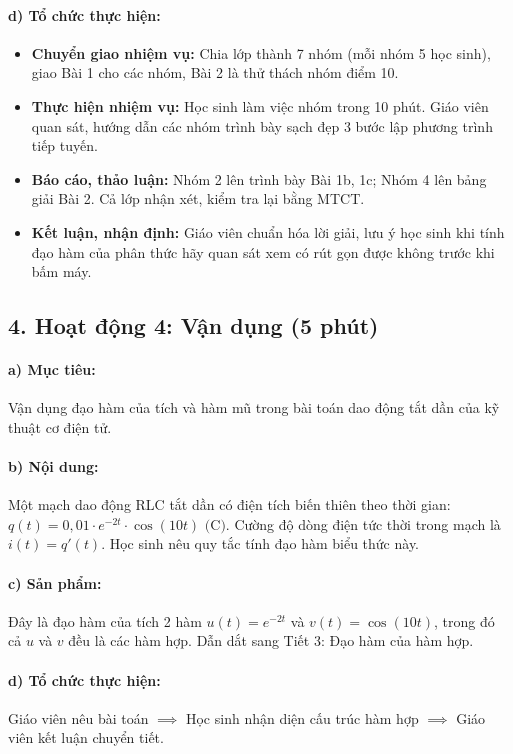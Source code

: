\documentclass[12pt, a4paper]{article}
\begin{document}
\paragraph{d) Tổ chức thực hiện:}
\begin{itemize}[leftmargin=0.8cm]
    \item \textbf{Chuyển giao nhiệm vụ:} Chia lớp thành 7 nhóm (mỗi nhóm 5 học sinh), giao Bài 1 cho các nhóm, Bài 2 là thử thách nhóm điểm 10.
    \item \textbf{Thực hiện nhiệm vụ:} Học sinh làm việc nhóm trong 10 phút. Giáo viên quan sát, hướng dẫn các nhóm trình bày sạch đẹp 3 bước lập phương trình tiếp tuyến.
    \item \textbf{Báo cáo, thảo luận:} Nhóm 2 lên trình bày Bài 1b, 1c; Nhóm 4 lên bảng giải Bài 2. Cả lớp nhận xét, kiểm tra lại bằng MTCT.
    \item \textbf{Kết luận, nhận định:} Giáo viên chuẩn hóa lời giải, lưu ý học sinh khi tính đạo hàm của phân thức hãy quan sát xem có rút gọn được không trước khi bấm máy.
\end{itemize}

\subsection*{4. Hoạt động 4: Vận dụng (5 phút)}

\paragraph{a) Mục tiêu:} Vận dụng đạo hàm của tích và hàm mũ trong bài toán dao động tắt dần của kỹ thuật cơ điện tử.

\paragraph{b) Nội dung:} Một mạch dao động RLC tắt dần có điện tích biến thiên theo thời gian: $q(t) = 0{,}01 \cdot e^{-2t} \cdot \cos(10t)\text{ (C)}$. Cường độ dòng điện tức thời trong mạch là $i(t) = q'(t)$. Học sinh nêu quy tắc tính đạo hàm biểu thức này.

\paragraph{c) Sản phẩm:} Đây là đạo hàm của tích 2 hàm $u(t) = e^{-2t}$ và $v(t) = \cos(10t)$, trong đó cả $u$ và $v$ đều là các hàm hợp. Dẫn dắt sang Tiết 3: Đạo hàm của hàm hợp.

\paragraph{d) Tổ chức thực hiện:} Giáo viên nêu bài toán $\implies$ Học sinh nhận diện cấu trúc hàm hợp $\implies$ Giáo viên kết luận chuyển tiết.
\end{document}
